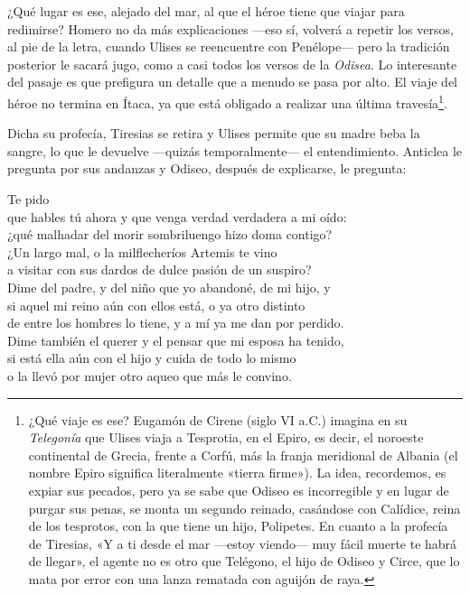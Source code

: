¿Qué lugar es ese, alejado del mar, al que el héroe tiene que viajar para redimirse? Homero no da más explicaciones ---eso sí, volverá a repetir los versos, al pie de la letra, cuando Ulises se reencuentre con Penélope--- pero la tradición posterior le sacará jugo, como a casi todos los versos de la \emph{Odisea}. Lo interesante del pasaje es que prefigura un detalle que a menudo se pasa por alto. El viaje del héroe no termina en Ítaca, ya que está obligado a realizar una última travesía\footnote{¿Qué viaje es ese? Eugamón de Cirene (siglo VI a.C.) imagina en su \emph{Telegonía} que Ulises viaja a Tesprotia, en el Epiro, es decir, el noroeste continental de Grecia, frente a Corfú, más la franja meridional de Albania (el nombre Epiro significa literalmente «tierra firme»). La idea, recordemos, es expiar sus pecados, pero ya se sabe que Odiseo es incorregible y en lugar de purgar sus penas, se monta un segundo reinado, casándose con Calídice, reina de los tesprotos, con la que tiene un hijo, Polipetes. En cuanto a la profecía de Tiresias, «Y a ti desde el mar ---estoy viendo--- muy fácil muerte te habrá de llegar», el agente no es otro que Telégono, el hijo de Odiseo y Circe, que lo mata por error con una lanza rematada con aguijón de raya.}.

Dicha su profecía, Tiresias se retira y Ulises permite que su madre beba la sangre, lo que le devuelve ---quizás temporalmente--- el entendimiento. Anticlea le pregunta por sus andanzas y Odiseo, después de explicarse, le pregunta:

\begin{versocita}
[...] Te pido\\
que hables tú ahora y que venga verdad verdadera a mi oído:\\
¿qué malhadar del morir sombriluengo hizo doma contigo?\\
¿Un largo mal, o la milflecheríos Artemis te vino\\
a visitar con sus dardos de dulce pasión de un suspiro?\\
Dime del padre, y del niño que yo abandoné, de mi hijo, y\\
si aquel mi reino aún con ellos está, o ya otro distinto\\
de entre los hombres lo tiene, y a mí ya me dan por perdido.\\
Dime también el querer y el pensar que mi esposa ha tenido,\\
si está ella aún con el hijo y cuida de todo lo mismo\\
o la llevó por mujer otro aqueo que más le convino.
\end{versocita}

